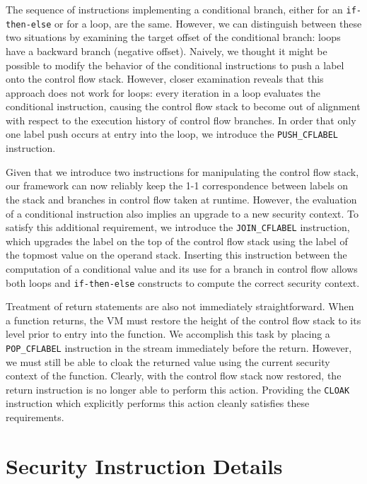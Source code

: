 \documentclass[preprint]{sigplanconf}
\begin{document}
The sequence of instructions implementing a conditional branch, either for an \texttt{if-then-else} or for a loop, are the same.
However, we can distinguish between these two situations by examining the target offset of the conditional branch: loops have a backward branch (negative offset).
Naively, we thought it might be possible to modify the behavior of the conditional instructions to push a label onto the control flow stack.
However, closer examination reveals that this approach does not work for loops: every iteration in a loop evaluates the conditional instruction, causing the control flow stack to become out of alignment with respect to the execution history of control flow branches.
In order that only one label push occurs at entry into the loop, we introduce the \texttt{PUSH\_CFLABEL} instruction.

Given that we introduce two instructions for manipulating the control flow stack, our framework can now reliably keep the 1-1 correspondence between labels on the stack and branches in control flow taken at runtime.
However, the evaluation of a conditional instruction also implies an upgrade to a new security context.
To satisfy this additional requirement, we introduce the \texttt{JOIN\_CFLABEL} instruction, which upgrades the label on the top of the control flow stack using the label of the topmost value on the operand stack.
Inserting this instruction between the computation of a conditional value and its use for a branch in control flow allows both loops and \texttt{if-then-else} constructs to compute the correct security context.

Treatment of return statements are also not immediately straightforward.
When a function returns, the VM must restore the height of the control flow stack to its level prior to entry into the function.
We accomplish this task by placing a \texttt{POP\_CFLABEL} instruction in the stream immediately before the return.
However, we must still be able to cloak the returned value using the current security context of the function.
Clearly, with the control flow stack now restored, the return instruction is no longer able to perform this action.
Providing the \texttt{CLOAK} instruction which explicitly performs this action cleanly satisfies these requirements.

\section{Security Instruction Details}
\label{sec:security-bytecodes}
\end{document}
